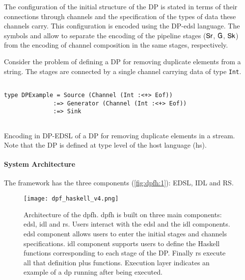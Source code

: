 The configuration of the initial structure of the DP is stated in terms of their connections through channels and the specification of the types of data these channels carry. This configuration is encoded using the DP-\acrshort{edsl}  language. The symbols \text{\texttt{:=>}} and \text{\texttt{:<+>}} allow to separate the encoding of the pipeline stages ($\mathsf{Sr}$, $\mathsf{G}$, $\mathsf{Sk}$) from the encoding of channel composition in the same stages, respectively.

%
\begin{example}
Consider the problem of defining a DP for removing duplicate elements from a string. The stages are connected by a single channel carrying data of type \texttt{\texttt{Int}}.

\begin{listing}[H]
  \begin{verbatim}

type DPExample = Source (Channel (Int :<+> Eof)) 
              :=> Generator (Channel (Int :<+> Eof)) 
              :=> Sink
   
  \end{verbatim}
  \caption[{[\texttt{Repeated.hs} Example of \acrshort{dp} encoded in $G_{dsl}$}]{Encoding in DP-EDSL of a DP for removing duplicate elements in a stream. Note that the DP is defined at type level of the host language (\acrshort{hs}).}
  \label{src:dpfh:3}
\end{listing}
\end{example}

\paragraph{\textbf{System Architecture}}  The framework has the three components (\autoref{fig:dpfh:1}): EDSL, IDL and RS.\\
%

\begin{figure}[!ht]
  \centering
   \texttt{[image: dpf\_haskell\_v4.png]}
    \caption[{[\acrshort{dpfh}] System Architecture of the \acrshort{dpfh}}]{Architecture of the \acrshort{dpfh}. \acrshort{dpfh} is built on three main components: \acrshort{edsl}, \acrshort{idl} and \acrshort{rs}. Users interact with the \acrshort{edsl} and the \acrshort{idl} components. \acrshort{edsl} component allows users to enter the initial stages and  channels specifications. \acrshort{idl} component supports users to define the Haskell functions corresponding to each stage of the DP. Finally \acrshort{rs} execute all that definition plus functions. Execution layer indicates an example of a \acrshort{dp} running after being executed.}
    \label{fig:dpfh:1}
\end{figure}

